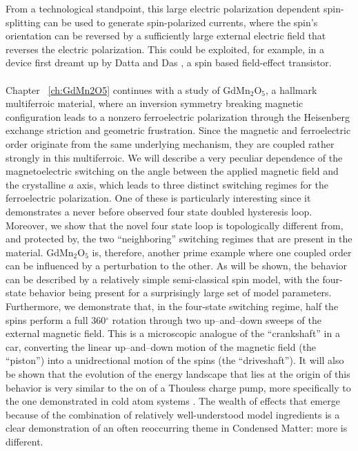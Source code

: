 From a technological standpoint, this large electric polarization dependent spin-splitting can be used to generate spin-polarized currents, where the spin's orientation can be reversed by a sufficiently large external electric field that reverses the electric polarization.
This could be exploited, for example, in a device first dreamt up by Datta and Das \cite{Datta1990}, a spin based field-effect transistor.
\\\\
Chapter ~\ref{ch:GdMn2O5} continues with a study of GdMn$_2$O$_5$, a hallmark multiferroic material, where an inversion symmetry breaking magnetic configuration leads to a nonzero ferroelectric polarization through the Heisenberg exchange striction and geometric frustration.
Since the magnetic and ferroelectric order originate from the same underlying mechanism, they are coupled rather strongly in this multiferroic.
We will describe a very peculiar dependence of the magnetoelectric switching on the angle between the applied magnetic field and the crystalline $a$ axis, which leads to three distinct switching regimes for the ferroelectric polarization.
One of these is particularly interesting since it demonstrates a never before observed four state doubled hysteresis loop.
Moreover, we show that the novel four state loop is topologically different from, and protected by, the two ``neighboring'' switching regimes that are present in the material.
GdMn$_2$O$_5$ is, therefore, another prime example where one coupled order can be influenced by a perturbation to the other.
As will be shown, the behavior can be described by a relatively simple semi-classical spin model, with the four-state behavior being present for a surprisingly large set of model parameters.
Furthermore, we demonstrate that, in the four-state switching regime, half the spins perform a full 360$^\circ$ rotation through two up--and--down sweeps of the external magnetic field.
This is a microscopic analogue of the ``crankshaft'' in a car, converting the linear up--and--down motion of the magnetic field (the ``piston'') into a unidrectional motion of the spins (the ``driveshaft'').
It will also be shown that the evolution of the energy landscape that lies at the origin of this behavior is very similar to the on of a Thouless charge pump, more specifically to the one demonstrated in cold atom systems \cite{Lohse16}.
The wealth of effects that emerge because of the combination of relatively well-understood model ingredients is a clear demonstration of an often reoccurring theme in Condensed Matter: more is different.  
